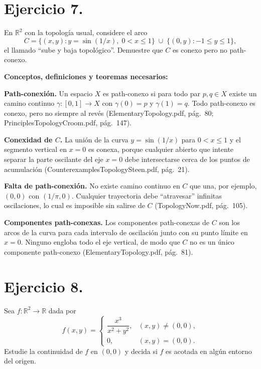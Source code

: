 \documentclass[a4paper,11pt]{article}  %
\begin{document}
\bigskip

\section*{Ejercicio 7.}
En \(\mathbb{R}^2\) con la topología usual, considere el arco
\[
C
=\bigl\{(x,y)\colon y=\sin(1/x),\;0<x\le1\bigr\}
\;\cup\;
\bigl\{(0,y)\colon -1\le y\le1\bigr\},
\]
el llamado “sube y baja topológico”. Demuestre que \(C\) es conexo pero no path-conexo.

\medskip
\textbf{Conceptos, definiciones y teoremas necesarios:}

\textbf{Path-conexión.}  
Un espacio \(X\) es path-conexo si para todo par \(p,q\in X\) existe un camino continuo \(\gamma\colon[0,1]\to X\) con \(\gamma(0)=p\) y \(\gamma(1)=q\). Todo path-conexo es conexo, pero no siempre al revés (ElementaryTopology.pdf, pág.\ 80; PrinciplesTopologyCroom.pdf, pág.\ 147).

\textbf{Conexidad de \(C\).}  
La unión de la curva \(y=\sin(1/x)\) para \(0<x\le1\) y el segmento vertical en \(x=0\) es conexa, porque cualquier abierto que intente separar la parte oscilante del eje \(x=0\) debe intersectarse cerca de los puntos de acumulación (CounterexamplesTopologySteen.pdf, pág.\ 21).

\textbf{Falta de path-conexión.}  
No existe camino continuo en \(C\) que una, por ejemplo, \((0,0)\) con \((1/\pi,0)\). Cualquier trayectoria debe “atravesar” infinitas oscilaciones, lo cual es imposible sin salirse de \(C\) (TopologyNow.pdf, pág.\ 105).

\textbf{Componentes path-conexas.}  
Los componentes path-conexas de \(C\) son los arcos de la curva para cada intervalo de oscilación junto con su punto límite en \(x=0\). Ninguno engloba todo el eje vertical, de modo que \(C\) no es un único componente path-conexo (ElementaryTopology.pdf, pág.\ 81).

\bigskip

\section*{Ejercicio 8.}
Sea \(f\colon \mathbb{R}^2 \to \mathbb{R}\) dada por
\[
f(x,y)=
\begin{cases}
\dfrac{x^3}{x^2+y^2}, & (x,y)\neq(0,0),\\
0, & (x,y)=(0,0).
\end{cases}
\]
Estudie la continuidad de \(f\) en \((0,0)\) y decida si \(f\) es acotada en algún entorno del origen.
\end{document}
